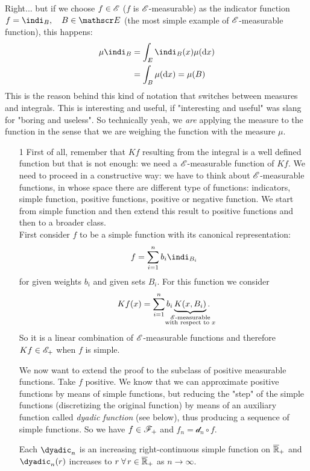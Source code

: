 \documentclass{report}
\begin{document}
Right... but if we choose $f\in\mathscr{E}$ ($f$ is $\mathscr{E}$-measurable) as the indicator function $f=\indi_B,\quad B\in \E$ (the most simple example of $\mathscr{E}$-measurable function), this happens:
\begin{align*}
	\mu\indi_B&=\int_E\indi_B(x)\mu(\dx)\\
	&=\int_B\mu(\dx)=\mu(B)
\end{align*}
This is the reason behind this kind of notation that switches between measures and integrals. This is interesting and useful, if "interesting and useful" was slang for "boring and useless". So technically yeah, we \textit{are} applying the measure to the function in the sense that we are weighing the function with the measure $\mu$. 
\begin{fancyproof}
	\begin{enumerate}
		\item[1] First of all, remember that $Kf$ resulting from the integral is a well defined function but that is not enough: we need a $\mathscr{E}$-measurable function of $K f$. We need to proceed in a constructive way: we have to think about $\mathscr{E}$-measurable functions, in whose space there are different type of functions: indicators, simple function, positive functions, positive or negative function. We start from simple function and then extend this result to positive functions and then to a broader class.\\
		First consider $f$ to be a simple function with its canonical representation:
		\[
		f=\sum_{i=1}^{n}b_i\indi_{B_i}
		\]
		for given weights $b_i$ and given sets $B_i$. For this function we consider
		\[Kf(x)=\sum_{i=1}^{n}b_i\underbrace{K(x,B_i)}_{\mathclap{\substack{\E\text{-measurable}\\ \text{with respect to }x}}}.\]
		So it is a linear combination of $\mathscr{E}$-measurable functions and therefore $K f\in\mathscr{E}_+$ when $f$ is simple. \par
		We now want to extend the proof to the subclass of positive measurable functions. Take $f$ positive. We know that we can approximate positive functions by means of simple functions, but reducing the "step" of the simple functions (discretizing the original function) by means of an auxiliary function called \emph{dyadic function} (see below), thus producing a sequence of simple functions. So we have
		$f\in\mathscr{F}_+$ and $f_n=\mathcal{d}_n\circ f$. \begin{lemma}
			Each $\dyadic_n$ is an increasing right-continuous simple function on $\overline{\mathbb{R}}_+$ and $\dyadic_n(r)$ increases to $r\;\forall\, r\in\overline{\mathbb{R}}_+$ as $n\to\infty$.

\end{lemma}
\end{enumerate}
\end{fancyproof}
\end{document}
